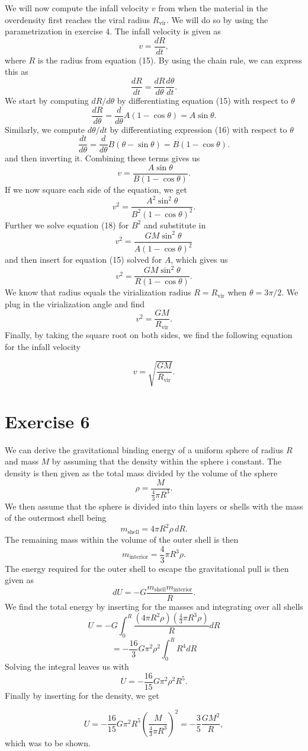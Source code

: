 \documentclass[a4paper]{article}
\begin{document}
We will now compute the infall velocity $v$ from when the material in the overdensity first reaches the viral radius $R_{\text{vir}}$. We will do so by using the parametrization in exercise 4. The infall velocity is given as
\[
    v = \frac{dR}{dt},
\]
where $R$ is the radius from equation (15). By using the chain rule, we can express this as 
\[
    \frac{dR}{dt} = \frac{dR}{d\theta} \frac{d \theta}{dt}.
\]
We start by computing $dR/d\theta$ by differentiating equation (15) with respect to $\theta$
\[
    \frac{dR}{d\theta} = \frac{d}{d\theta} A(1-\cos\theta) = A \sin \theta.
\]
Similarly, we compute $d\theta/dt$ by differentiating expression (16) with respect to $\theta$
\[
    \frac{dt}{d\theta} = \frac{d}{d\theta} B(\theta-\sin\theta) = B(1 - \cos \theta).
\]
and then inverting it. Combining these terms gives us
\[
    v = \frac{A \sin \theta}{B (1- \cos \theta)}.
\]
If we now square each side of the equation, we get
\[
v^2 = \frac{A^2 \sin^2 \theta}{B^2 (1-\cos \theta)^2}.
\]
Further we solve equation (18) for $B^2$ and substitute in
\[
v^2 = \frac{GM\sin^2 \theta}{A(1-\cos \theta)^2}
\]
and then insert for equation (15) solved for $A$, which gives us
\[
    v^2 = \frac{GM \sin^2 \theta}{R (1-\cos \theta)}.
\]
We know that radius equals the virialization radius $R=R_\text{vir}$ when $\theta = 3\pi / 2$. We plug in the virialization angle and find
\[
    v^2 = \frac{GM}{R_\text{vir}}.
\]
Finally, by taking the square root on both sides, we find the following equation for the infall velocity

\begin{equation}
    v = \sqrt{\frac{GM}{R_\text{vir}}}.
\end{equation}
\section*{Exercise 6}

We can derive the gravitational binding energy of a uniform sphere of radius $R$ and mass $M$ by assuming that the density within the sphere i constant. The density is then given as the total mass divided by the volume of the sphere
\[
\rho = \frac{M}{\frac{4}{3} \pi R^3}.
\]
We then assume that the sphere is divided into thin layers or shells with the mass of the outermost shell being
\[
m_{\text{shell}} = 4\pi R^2 \rho\, dR.
\]
The remaining mass within the volume of the outer shell is then
\[
m_{\text{interior}} = \frac{4}{3}\pi R^3 \rho.
\]
The energy required for the outer shell to escape the gravitational pull is then given as
\[
dU = -G\frac{m_{\text{shell}} m_{\text{interior}} }{R}.
\]
We find the total energy by inserting for the masses and integrating over all shells
\[
U = -G \int^R_0 \frac{\left(4\pi R^2 \rho\right)  \left(\frac{4}{3}\pi R^3 \rho \right)}{R} dR
\]
\[
= - \frac{16}{3} G\pi^2 \rho^2 \int_0^R R^4 dR
\]
Solving the integral leaves us with 
\[
U = - \frac{16}{15} G \pi^2 \rho^2 R^5.
\]
Finally by inserting for the density, we get

\[
U = - \frac{16}{15} G \pi^2 R^5 \left(\frac{M}{\frac{4}{3} \pi R^3}\right)^2 = - \frac{3}{5} \frac{GM^2}{R},
\]
which was to be shown.
\end{document}
